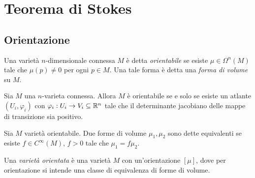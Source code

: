 \chapter{Teorema di Stokes}




\section{Orientazione}

\begin{definition}  
	Una varietà $n$-dimensionale connessa $M$ è detta \emph{orientabile} se esiste $\mu\in\Omega^n(M)$ tale che $\mu(p)\not=0$ per ogni $p\in M$. Una tale forma è detta una \emph{forma di volume} su $M$.
\end{definition}

\begin{proposition}
	Sia $M$ una $n$-varieta connessa. Allora $M$ è orientabile se e solo se esiste un atlante $(U_i,\varphi_i)$ con $\varphi_i:U_i\to V_i\subseteq \mathbb R^n$ tale che il determinante jacobiano delle mappe di transizione sia positivo.
\end{proposition}

\begin{definition} 
	Sia $M$ varietà orientabile. Due forme di volume $\mu_1,\mu_2$ sono dette equivalenti se esiste $f\in C^\infty(M)$, $f>0$ tale che $\mu_1= f \mu_2$.
	
	Una \emph{varietà orientata} è una varietà $M$ con un'orientazione $[\mu]$, dove per orientazione si intende una classe di equivalenza di forme di volume.
\end{definition}

